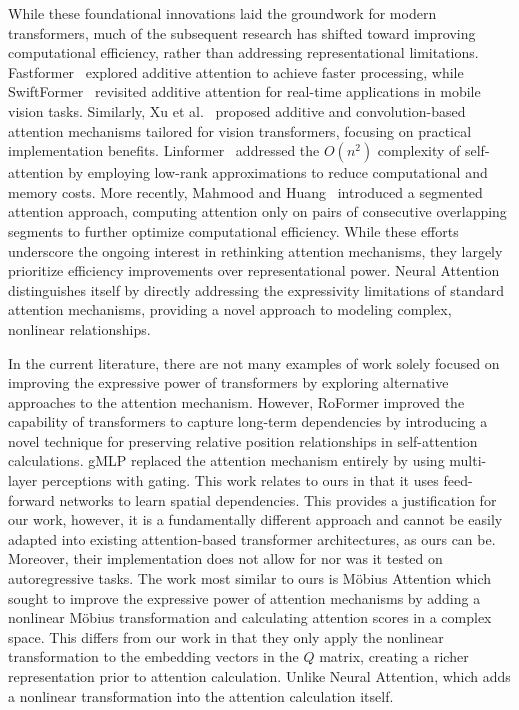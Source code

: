 \documentclass{article}
\begin{document}
While these foundational innovations laid the groundwork for modern transformers, much of the subsequent research has shifted toward improving computational efficiency, rather than addressing representational limitations. Fastformer~\cite{wu2021fastformer} explored additive attention to achieve faster processing, while SwiftFormer~\cite{shaker2023swiftformer} revisited additive attention for real-time applications in mobile vision tasks. Similarly, Xu et al.~\cite{zhang2024cas} proposed additive and convolution-based attention mechanisms tailored for vision transformers, focusing on practical implementation benefits. Linformer~\cite{wang2020linformer} addressed the $O(n^2)$ complexity of self-attention by employing low-rank approximations to reduce computational and memory costs. More recently, Mahmood and Huang~\cite{mahmood2024enhanced} introduced a segmented attention approach, computing attention only on pairs of consecutive overlapping segments to further optimize computational efficiency. While these efforts underscore the ongoing interest in rethinking attention mechanisms, they largely prioritize efficiency improvements over representational power. Neural Attention distinguishes itself by directly addressing the expressivity limitations of standard attention mechanisms, providing a novel approach to modeling complex, nonlinear relationships. 

In the current literature, there are not many examples of work solely focused on improving the expressive power of transformers by exploring alternative approaches to the attention mechanism. However, RoFormer \cite{su2024roformer} improved the capability of transformers to capture long-term dependencies by introducing a novel technique for preserving relative position relationships in self-attention calculations. gMLP \cite{liu2021pay} replaced the attention mechanism entirely by using multi-layer perceptions with gating. This work relates to ours in that it uses feed-forward networks to learn spatial dependencies. This provides a justification for our work, however, it is a fundamentally different approach and cannot be easily adapted into existing attention-based transformer architectures, as ours can be. Moreover, their implementation does not allow for nor was it tested on autoregressive tasks. The work most similar to ours is M{\"o}bius Attention \cite{halacheva2024expanding} which sought to improve the expressive power of attention mechanisms by adding a nonlinear M{\"o}bius transformation and calculating attention scores in a complex space. This differs from our work in that they only apply the nonlinear transformation to the embedding vectors in the $\mathit{Q}$ matrix, creating a richer representation prior to attention calculation. Unlike Neural Attention, which adds a nonlinear transformation into the attention calculation itself. 
\end{document}
